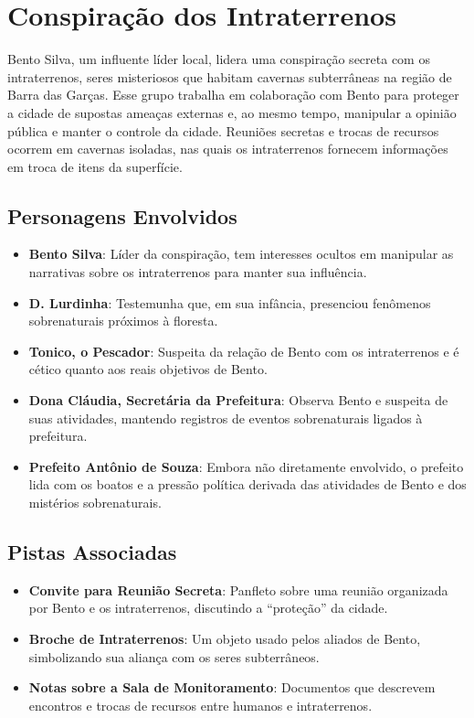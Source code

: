 \section{Conspiração dos Intraterrenos}
Bento Silva, um influente líder local, lidera uma conspiração secreta com os intraterrenos, seres misteriosos que habitam cavernas subterrâneas na região de Barra das Garças. Esse grupo trabalha em colaboração com Bento para proteger a cidade de supostas ameaças externas e, ao mesmo tempo, manipular a opinião pública e manter o controle da cidade. Reuniões secretas e trocas de recursos ocorrem em cavernas isoladas, nas quais os intraterrenos fornecem informações em troca de itens da superfície.

\subsection{Personagens Envolvidos}
\begin{itemize}
    \item \textbf{Bento Silva}: Líder da conspiração, tem interesses ocultos em manipular as narrativas sobre os intraterrenos para manter sua influência.
    \item \textbf{D. Lurdinha}: Testemunha que, em sua infância, presenciou fenômenos sobrenaturais próximos à floresta.
    \item \textbf{Tonico, o Pescador}: Suspeita da relação de Bento com os intraterrenos e é cético quanto aos reais objetivos de Bento.
    \item \textbf{Dona Cláudia, Secretária da Prefeitura}: Observa Bento e suspeita de suas atividades, mantendo registros de eventos sobrenaturais ligados à prefeitura.
    \item \textbf{Prefeito Antônio de Souza}: Embora não diretamente envolvido, o prefeito lida com os boatos e a pressão política derivada das atividades de Bento e dos mistérios sobrenaturais.
\end{itemize}

\subsection{Pistas Associadas}
\begin{itemize}
    \item \textbf{Convite para Reunião Secreta}: Panfleto sobre uma reunião organizada por Bento e os intraterrenos, discutindo a “proteção” da cidade.
    \item \textbf{Broche de Intraterrenos}: Um objeto usado pelos aliados de Bento, simbolizando sua aliança com os seres subterrâneos.
    \item \textbf{Notas sobre a Sala de Monitoramento}: Documentos que descrevem encontros e trocas de recursos entre humanos e intraterrenos.
\end{itemize}

